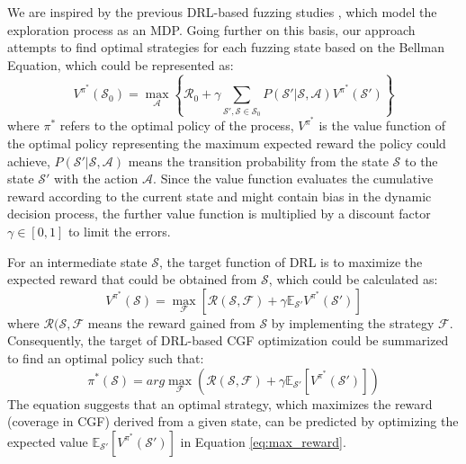 \documentclass[lettersize,journal]{IEEEtran}
\begin{document}
We are inspired by the previous DRL-based fuzzing studies \cite{bottingerDeepReinforcementFuzzing2018,binosiRainfuzzReinforcementlearningDriven2023,liangRLFDirectedFuzzing2022}, which model the exploration process as an MDP. Going further on this basis, our approach attempts to find optimal strategies for each fuzzing state based on the Bellman Equation, which could be represented as:
\begin{equation}
	V^{\pi^*}(\mathcal{S}_0) = \max_{\mathcal{A}}\left\{\mathcal{R}_0 + \gamma \sum_{\mathcal{S}', \mathcal{S}\in \mathcal{S}_0}P(\mathcal{S}'|\mathcal{S},\mathcal{A})V^{\pi^*}(\mathcal{S}')\right\}
\end{equation}
where $\pi^*$ refers to the optimal policy of the process, $V^{\pi^*}$ is the value function of the optimal policy representing the maximum expected reward the policy could achieve, $P(\mathcal{S}'|\mathcal{S}, \mathcal{A})$ means the transition probability from the state $\mathcal{S}$ to the state $\mathcal{S}'$ with the action $\mathcal{A}$. Since the value function evaluates the cumulative reward according to the current state and might contain bias in the dynamic decision process, the further value function is multiplied by a discount factor $\gamma \in [0, 1]$ to limit the errors.

For an intermediate state $\mathcal{S}$, the target function of DRL is to maximize the expected reward that could be obtained from $\mathcal{S}$, which could be calculated as:
\begin{equation}
	V^{\pi^*}(\mathcal{S}) = \max_{\mathcal{F}}\left[\mathcal{R}(\mathcal{S}, \mathcal{F}) + \gamma \mathbb{E}_{\mathcal{S}'}V^{\pi^*}(\mathcal{S}')\right]
\end{equation}
where $\mathcal{R}(\mathcal{S}, \mathcal{F}$ means the reward gained from $\mathcal{S}$ by implementing the strategy $\mathcal{F}$. Consequently, the target of DRL-based CGF optimization could be summarized to find an optimal policy such that:
\begin{equation}
	\pi^*(\mathcal{S}) = \textit{arg} \max_{\mathcal{F}}\left(\mathcal{R}(\mathcal{S}, \mathcal{F}) + \gamma\mathbb{E}_{\mathcal{S}'}\left[V^{\pi^*}(\mathcal{S}')\right]\right)
	\label{eq:max_reward}
\end{equation}
The equation suggests that an optimal strategy, which maximizes the reward (coverage in CGF) derived from a given state, can be predicted by optimizing the expected value $\mathbb{E}_{\mathcal{S}'}\left[V^{\pi^*}(\mathcal{S}')\right]$ in Equation \ref{eq:max_reward}.
\end{document}
